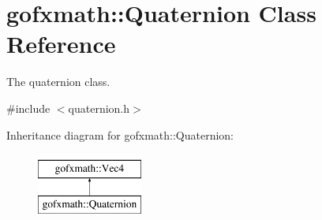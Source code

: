 \hypertarget{classgofxmath_1_1_quaternion}{}\section{gofxmath\+:\+:Quaternion Class Reference}
\label{classgofxmath_1_1_quaternion}


The quaternion class.  




{\ttfamily \#include $<$quaternion.\+h$>$}

Inheritance diagram for gofxmath\+:\+:Quaternion\+:\begin{figure}[H]
\begin{center}
\leavevmode
\includegraphics[height=2.000000cm]{classgofxmath_1_1_quaternion}
\end{center}
\end{figure}
